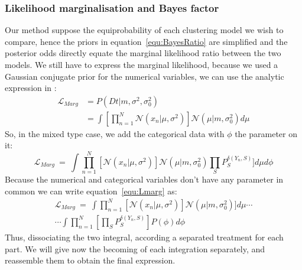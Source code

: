 \documentclass[twocolumn]{article}
\begin{document}
\subsubsection{Likelihood marginalisation and Bayes factor}

Our method suppose the equiprobability of each clustering model we wish to compare, hence the priors in equation~\ref{equ:BayesRatio} are simplified and the posterior odds directly equate the marginal likelihood ratio between the two models.
We still have to express the marginal likelihood, because we used a Gaussian conjugate prior for the numerical variables, we can use the analytic expression in \cite{murphy}:
\begin{align}
    \mathcal{L}_{Marg} &= P(Dt|m,\sigma^2,\sigma_0^2) \nonumber \\ 
                     &= \int[\prod_{n=1}^N\mathcal{N}(x_n|\mu,\sigma^2)]\mathcal{N}(\mu|m,\sigma_0^2)d\mu
    \label{equ:postuMarph}
\end{align}
So, in the mixed type case, we add the categorical data with $\phi$ the parameter on it:
\begin{equation}
    \mathcal{L}_{Marg}\ =\ \int\prod_{n=1}^N[\mathcal{N}(x_n|\mu,\sigma^2)]\mathcal{N}(\mu|m,\sigma_0^2)\prod_SP_{S}^{\delta(Y_{n},S)}]d\mu d\phi
    \label{equ:Lmarg}
\end{equation}
Because the numerical and categorical variables don't have any parameter in common we can write equation~\ref{equ:Lmarg} as:
\begin{align}
    \mathcal{L}_{Marg}\ =\ \int\prod_{n=1}^N[\mathcal{N}(x_n|\mu,\sigma^2)]\mathcal{N}(\mu|m,\sigma_0^2)]d\mu\cdots \nonumber \\
                    \cdots\int\prod_{n=1}^N[\prod_SP_{S}^{\delta(Y_{n},S)}]P(\phi)d\phi
    \label{equ:Lmarg}
\end{align}
Thus, dissociating the two integral, according a separated treatment for each part.
We will give now the becoming of each integration separately, and reassemble them to obtain the final expression.\\
\end{document}

